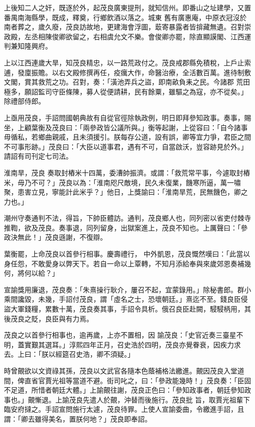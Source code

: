 \begin{pinyinscope}
 上後知二人之奸，既逐於外，起茂良廣東提刑，就知信州。即番山之址建學，又置番禺南海縣學，既成，釋奠，行鄉飲酒以落之。城東
 舊有廣惠庵，中原衣冠沒於南者葬之，歲久廢，茂良訪故地，更建海會浮圖，菆寄暴露者皆揜藏無遺。召對崇政殿，左丞相陳俊卿欲留之，右相虞允文不樂。會俊卿亦罷，除直顯謨閣、江西運判兼知隆興府。



 上以江西連歲大旱，知茂良精忠，以一路荒政付之。茂良戒郡縣免積稅，上戶止索逋，發廩振贍。以右文殿修撰再任，疫癘大作，命醫治療，全活數百萬。進待制敷文閣，賞其救荒之功。召對，奏：「潢池弄兵之盜，即南畝負耒之民。今諸郡
 荒田極多，願詔監司守臣條陳，募人從便請耕，民有餘粟，雖驅之為寇，亦不從矣。」除禮部侍郎。



 上亟用茂良，手詔問國朝典故有自從官徑除執政例，明日即拜參知政事。奏事，賜坐，上顧葉衡及茂良曰：「兩參政皆公議所與。」衡等起謝，上從容曰：「自今諸事毋循私，若鄉曲親戚，且未須援引。朕每存公道，設有誤，卿等宜力爭，君臣之間不可事形跡。」茂良曰：「大臣以道事君，遇有不可，自當啟沃，豈容跡見於外。」請詔有司刊定七司法。



 淮南旱，茂良
 奏取封樁米十四萬，委漕帥振濟。或謂：「救荒常平事，今遽取封樁米，毋乃不可？」茂良以為：「淮南咫尺敵境，民久未復業，饑寒所逼，萬一嘯聚，患害立見，寧能計此米乎？」他日，上獎諭曰：「淮南旱荒，民無饑色，卿之力也。」



 潮州守奏通判不法，得旨，下帥臣體訪。通判，茂良鄉人也，同列密以省吏付棘寺推鞫，欲及茂良。奏事退，同列留身，出獄案進上，茂良不知也。上厲聲曰：「參政決無此！」茂良遜謝，不復辯。



 葉衡罷，上命茂良以首參行相事。慶壽禮行，
 中外凱恩，茂良慨然嘆曰：「此當以身任怨，不敢愛身以弊天下。若自一命以上覃轉，不知月添給奉與來歲郊恩奏補幾何，將何以給？」



 宣諭獎用廉退，茂良奏：「朱熹操行耿介，屢召不起，宜蒙錄用。」除秘書郎。群小乘間讒毀，未幾，手詔付茂良，謂「虛名之士，恐壞朝廷。」熹迄不至。錢良臣侵盜大軍錢糧，累數十萬，茂良奏其事，手詔令具析。俄召良臣赴闕，駸駸柄用，其後茂良之貶，良臣與有力焉。



 茂良之以首參行相事也，逾再歲，上亦不置相，因
 諭茂良：「史官近奏三臺星不明，蓋實艱其選耳。」淳熙四年正月，召史浩於四明，茂良亦覺眷衰，因疾力求去。上曰：「朕以經筵召史浩，卿不須疑。」



 時曾覿欲以文資祿其孫，茂良以文武官各隨本色蔭補格法繳進。覿因茂良入堂道間，俾直省官賈光祖等當道不避。街司叱之，曰：「參政能幾時！」茂良奏：「臣固不足道，所惜者朝廷大體。」上諭覿往謝，茂良正色曰：「參知政事者，朝廷參知政事也。」覿慚退。上諭茂良先遣人於覿，沖替而後施行。茂良批
 旨，取賈光祖輩下臨安府撻之。手詔宣問施行太遽，茂良待罪。上使人宣諭委曲，令繳進手詔，且謂：「卿去雖得美名，置朕何地？」茂良即奉詔。




\end{pinyinscope}
